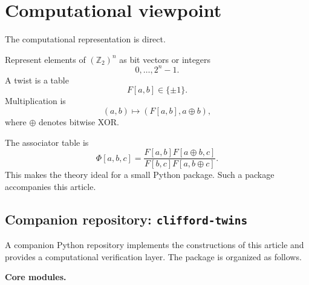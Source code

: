 \documentclass[11pt]{article}
\newcommand{\Ztwo}{\mathbb Z_2}
\newcommand{\assoc}{\Phi}
\begin{document}
\section{Computational viewpoint}

The computational representation is direct.

Represent elements of $(\Ztwo)^n$ as bit vectors or integers
\[
0,\dots,2^n-1.
\]
A twist is a table
\[
F[a,b]\in\{\pm 1\}.
\]
Multiplication is
\[
(a,b)\mapsto (F[a,b],a\oplus b),
\]
where $\oplus$ denotes bitwise XOR.

The associator table is
\[
\assoc[a,b,c]
=
\frac{F[a,b]F[a\oplus b,c]}
     {F[b,c]F[a,b\oplus c]}.
\]
This makes the theory ideal for a small Python package. Such a package
accompanies this article.

\subsection{Companion repository: \texttt{clifford-twins}}

A companion Python repository implements the constructions of this article
and provides a computational verification layer. The package is organized as
follows.

\medskip

\noindent\textbf{Core modules.}
\end{document}

